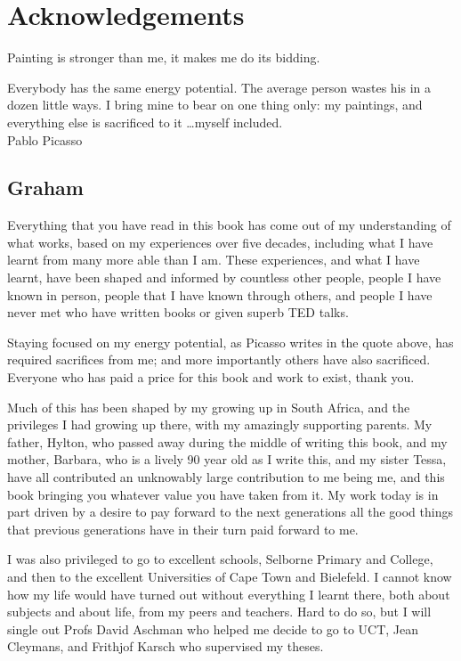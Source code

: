 ﻿%
\chapter{Acknowledgements}


\begin{chapterquotation}
Painting is stronger than me, it makes me do its bidding. \par  Everybody has the same energy potential. The average person wastes his in a dozen little ways. I bring mine to bear on one thing only: my paintings, and everything else is sacrificed to it \ldots myself included. \\
\raggedleft\textemdash Pablo Picasso
\end{chapterquotation}


\section*{Graham}
Everything that you have read in this book has come out of my understanding of what works, based on my experiences over five decades, including what I have learnt from many more able than I am. These experiences, and what I have learnt, have been shaped and informed by countless other people, people I have known in person, people that I have known through others, and people I have never met who have written books or given superb TED talks.


Staying focused on my energy potential, as Picasso writes in the quote above, has required sacrifices from me; and more importantly others have also sacrificed. Everyone who has paid a price for this book and work to exist, thank you. 


Much of this has been shaped by my growing up in South Africa, and the privileges I had growing up there, with my amazingly supporting parents. My father, Hylton, who passed away during the middle of writing this book, and my mother, Barbara, who is a lively 90 year old as I write this, and my sister Tessa, have all contributed an unknowably large contribution to me being me, and this book bringing you whatever value you have taken from it. My work today is in part driven by a desire to pay forward to the next generations all the good things that previous generations have in their turn paid forward to me. 


I was also privileged to go to excellent schools, Selborne Primary and College, and then to the  excellent Universities of Cape Town and Bielefeld. I cannot know how my life would have turned out without everything I learnt there, both about subjects and about life, from my peers and teachers. Hard to do so, but I will single out Profs David Aschman who helped me decide to go to UCT, Jean Cleymans, and Frithjof Karsch who supervised my theses. 


